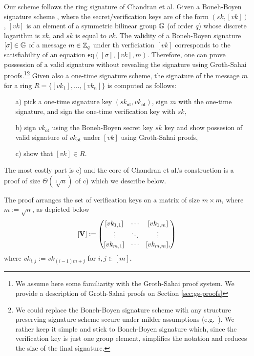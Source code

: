Our scheme follows the ring signature of Chandran et al. Given a {Boneh-Boyen signature scheme} \cite{EC:BonBoy04a}, where the secret/verification keys are of the form $(sk,[vk])$,  $[vk]$ is an element of a symmetric bilinear group $\mathbb{G}$ (of order $q$) whose discrete logarithm is $vk$, and $sk$ is equal to $vk$. The validity of a Boneh-Boyen signature $[\sigma]\in\mathbb{G}$ of a message $m\in\mathbb{Z}_q$ under th verficiation $[vk]$ corresponds to the satisfiability of an equation $\mathsf{eq}([\sigma],[vk],m)$. Therefore, one can prove possession of a valid signature without revealing the signature using Groth-Sahai proofs.\cite{EC:GroSah08}\footnote{We assume here some familiarity with the Groth-Sahai proof system. We provide a description of Groth-Sahai proofs on Section \ref{sec:gs-proofs}}\footnote{We could replace the Boneh-Boyen signature scheme with any structure preserving signature scheme secure under milder assumptions (e.g.~\cite{EPRINT:JutRoy17}). We rather keep it simple and stick to Boneh-Boyen signature which, since the verification key is just one group element, simplifies the notation and reduces the size of the final signature.}  Given also a {one-time signature scheme}, the signature of the message $m$ for a ring $R=\{[vk_1],\ldots,[vk_n]\}$ is computed as follows:
\begin{itemize}
\item[a)] pick a one-time signature key $(sk_\mathsf{ot},vk_\mathsf{ot})$, sign $m$ with the one-time signature, and sign the one-time verification key with $sk$,
\item[b)] sign $vk_\mathsf{ot}$ using the Boneh-Boyen secret key $sk$ key and show possesion of valid signature of $vk_\mathsf{ot}$ under $[vk]$ using Groth-Sahai proofs,
\item[c)] show that $[vk]\in R$.
\end{itemize}
The most costly part is c) and the core of Chandran et al.'s construction is a proof of size $\Theta(\sqrt[3]{n})$ of c) which we describe below.
 
The proof arranges the set of verification keys on a matrix of size $m\times m$, where $m:=\sqrt{n}$, as depicted below
$$
[\mathbf{{V}}]:=
\begin{pmatrix}
[vk_{1,1}] & \cdots & [vk_{1,m}]\\
\vdots     & \ddots & \vdots \\
[vk_{m,1}]  & \cdots & [vk_{m,m}],
\end{pmatrix}
$$
where $vk_{i,j}:=vk_{(i-1)m+j}$ for $i,j\in[m]$.

